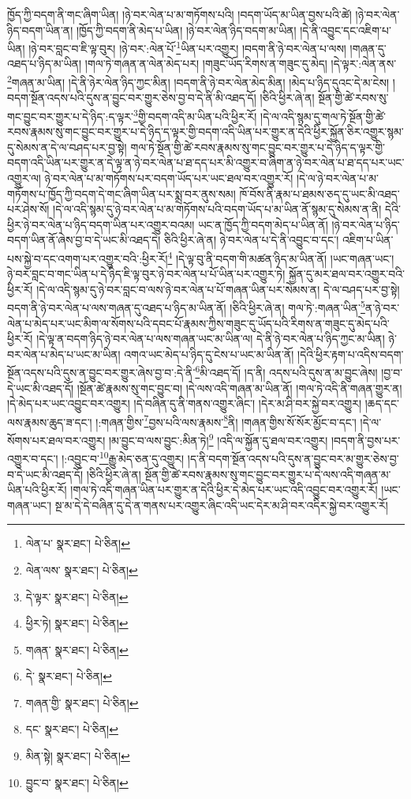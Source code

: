 ཁྱོད་ཀྱི་བདག་ནི་གང་ཞིག་ཡིན། །ཉེ་བར་ལེན་པ་མ་གཏོགས་པའི། །བདག་ཡོད་མ་ཡིན་བྱས་པའི་ཚེ། །ཉེ་བར་ལེན་ཉིད་བདག་ཡིན་ན། །ཁྱོད་ཀྱི་བདག་ནི་མེད་པ་ཡིན། །ཉེ་བར་ལེན་ཉིད་བདག་མ་ཡིན། །དེ་ནི་འབྱུང་དང་འཇིག་པ་ཡིན། །ཉེ་བར་བླང་བ་ཇི་ལྟ་བུར། །ཉེ་བར་:ལེན་པོ་\footnote{ལེན་པ་  སྣར་ཐང་།  པེ་ཅིན། }ཡིན་པར་འགྱུར། །བདག་ནི་ཉེ་བར་ལེན་པ་ལས། །གཞན་དུ་འཐད་པ་ཉིད་མ་ཡིན། །གལ་ཏེ་གཞན་ན་ལེན་མེད་པར། །གཟུང་ཡོད་རིགས་ན་གཟུང་དུ་མེད། །དེ་ལྟར་:ལེན་ནས་\footnote{ལེན་ལས་  སྣར་ཐང་།  པེ་ཅིན། }གཞན་མ་ཡིན། །དེ་ནི་ཉེར་ལེན་ཉིད་ཀྱང་མིན། །བདག་ནི་ཉེ་བར་ལེན་མེད་མིན། །མེད་པ་ཉིད་དུའང་དེ་མ་ངེས། །བདག་སྔོན་འདས་པའི་དུས་ན་བྱུང་བར་གྱུར་ཅེས་བྱ་བ་དེ་ནི་མི་འཐད་དོ། །ཅིའི་ཕྱིར་ཞེ་ན། སྔོན་གྱི་ཚེ་རབས་སུ་གང་བྱུང་བར་གྱུར་པ་དེ་ཉིད་:ད་ལྟར་\footnote{དེ་ལྟར་  སྣར་ཐང་།  པེ་ཅིན། }གྱི་བདག་འདི་མ་ཡིན་པའི་ཕྱིར་རོ། །དེ་ལ་འདི་སྙམ་དུ་གལ་ཏེ་སྔོན་གྱི་ཚེ་རབས་རྣམས་སུ་གང་བྱུང་བར་གྱུར་པ་དེ་ཉིད་ད་ལྟར་གྱི་བདག་འདི་ཡིན་པར་གྱུར་ན་དེའི་ཕྱིར་སྐྱོན་ཅིར་འགྱུར་སྙམ་དུ་སེམས་ན་དེ་ལ་བཤད་པར་བྱ་སྟེ། གལ་ཏེ་སྔོན་གྱི་ཚེ་རབས་རྣམས་སུ་གང་བྱུང་བར་གྱུར་པ་དེ་ཉིད་ད་ལྟར་གྱི་བདག་འདི་ཡིན་པར་གྱུར་ན་དེ་ལྟ་ན་ཉེ་བར་ལེན་པ་ཐ་དད་པར་མི་འགྱུར་བ་ཞིག་ན་ཉེ་བར་ལེན་པ་ཐ་དད་པར་ཡང་འགྱུར་ལ། ཉེ་བར་ལེན་པ་མ་གཏོགས་པར་བདག་ཡོད་པར་ཡང་ཐལ་བར་འགྱུར་རོ། །དེ་ལ་ཉེ་བར་ལེན་པ་མ་གཏོགས་པ་ཁྱོད་ཀྱི་བདག་དེ་གང་ཞིག་ཡིན་པར་སྨྲ་བར་ནུས་སམ། ཁོ་བོས་ནི་རྣམ་པ་ཐམས་ཅད་དུ་ཡང་མི་འཐད་པར་ཤེས་སོ། །དེ་ལ་འདི་སྙམ་དུ་ཉེ་བར་ལེན་པ་མ་གཏོགས་པའི་བདག་ཡོད་པ་མ་ཡིན་ནོ་སྙམ་དུ་སེམས་ན་ནི། དེའི་ཕྱིར་ཉེ་བར་ལེན་པ་ཉིད་བདག་ཡིན་པར་འགྱུར་བའམ། ཡང་ན་ཁྱོད་ཀྱི་བདག་མེད་པ་ཡིན་ནོ། །ཉེ་བར་ལེན་པ་ཉིད་བདག་ཡིན་ནོ་ཞེས་བྱ་བ་དེ་ཡང་མི་འཐད་དེ། ཅིའི་ཕྱིར་ཞེ་ན། ཉེ་བར་ལེན་པ་དེ་ནི་འབྱུང་བ་དང་། འཇིག་པ་ཡིན་པས་སྐྱེ་བ་དང་འགག་པར་འགྱུར་བའི་:ཕྱིར་རོ།\footnote{ཕྱིར་ཏེ།  སྣར་ཐང་།  པེ་ཅིན། } །དེ་ལྟ་བུ་ནི་བདག་གི་མཚན་ཉིད་མ་ཡིན་ནོ། །ཡང་གཞན་ཡང་། ཉེ་བར་བླང་བ་གང་ཡིན་པ་དེ་ཉིད་ཇི་ལྟ་བུར་ཉེ་བར་ལེན་པ་པོ་ཡིན་པར་འགྱུར་ཏེ། སྐྱོན་དུ་མར་ཐལ་བར་འགྱུར་བའི་ཕྱིར་རོ། །དེ་ལ་འདི་སྙམ་དུ་ཉེ་བར་བླང་བ་ལས་ཉེ་བར་ལེན་པ་པོ་གཞན་ཡིན་པར་སེམས་ན། དེ་ལ་བཤད་པར་བྱ་སྟེ། བདག་ནི་ཉེ་བར་ལེན་པ་ལས་གཞན་དུ་འཐད་པ་ཉིད་མ་ཡིན་ནོ། །ཅིའི་ཕྱིར་ཞེ་ན། གལ་ཏེ་:གཞན་ཡིན་\footnote{གཞན་  སྣར་ཐང་།  པེ་ཅིན། }ན་ཉེ་བར་ལེན་པ་མེད་པར་ཡང་མིག་ལ་སོགས་པའི་དབང་པོ་རྣམས་ཀྱིས་གཟུང་དུ་ཡོད་པའི་རིགས་ན་གཟུང་དུ་མེད་པའི་ཕྱིར་རོ། །དེ་ལྟ་ན་བདག་ཉིད་ཉེ་བར་ལེན་པ་ལས་གཞན་ཡང་མ་ཡིན་ལ། དེ་ནི་ཉེ་བར་ལེན་པ་ཉིད་ཀྱང་མ་ཡིན། ཉེ་བར་ལེན་པ་མེད་པ་ཡང་མ་ཡིན། འགའ་ཡང་མེད་པ་ཉིད་དུ་ངེས་པ་ཡང་མ་ཡིན་ནོ། །དེའི་ཕྱིར་རྟག་པ་འདིས་བདག་སྔོན་འདས་པའི་དུས་ན་བྱུང་བར་གྱུར་ཞེས་བྱ་བ་:དེ་ནི་\footnote{དེ་  སྣར་ཐང་།  པེ་ཅིན། }མི་འཐད་དོ། །ད་ནི། འདས་པའི་དུས་ན་མ་བྱུང་ཞེས། །བྱ་བ་དེ་ཡང་མི་འཐད་དོ། །སྔོན་ཚེ་རྣམས་སུ་གང་བྱུང་བ། །དེ་ལས་འདི་གཞན་མ་ཡིན་ནོ། །གལ་ཏེ་འདི་ནི་གཞན་གྱུར་ན། །དེ་མེད་པར་ཡང་འབྱུང་བར་འགྱུར། །དེ་བཞིན་དུ་ནི་གནས་འགྱུར་ཞིང་། །དེར་མ་ཤི་བར་སྐྱེ་བར་འགྱུར། །ཆད་དང་ལས་རྣམས་ཆུད་ཟ་དང་། །:གཞན་གྱིས་\footnote{གཞན་གྱི་  སྣར་ཐང་།  པེ་ཅིན། }བྱས་པའི་ལས་རྣམས་\footnote{དང་  སྣར་ཐང་།  པེ་ཅིན། }ནི། །གཞན་གྱིས་སོ་སོར་མྱོང་བ་དང་། །དེ་ལ་སོགས་པར་ཐལ་བར་འགྱུར། །མ་བྱུང་བ་ལས་བྱུང་:མིན་ཏེ།\footnote{མིན་སྟེ།  སྣར་ཐང་།  པེ་ཅིན། } །འདི་ལ་སྐྱོན་དུ་ཐལ་བར་འགྱུར། །བདག་ནི་བྱས་པར་འགྱུར་བ་དང་། །:འབྱུང་བ་\footnote{བྱུང་བ་  སྣར་ཐང་།  པེ་ཅིན། }རྒྱུ་མེད་ཅན་དུ་འགྱུར། །ད་ནི་བདག་སྔོན་འདས་པའི་དུས་ན་བྱུང་བར་མ་གྱུར་ཅེས་བྱ་བ་དེ་ཡང་མི་འཐད་དོ། །ཅིའི་ཕྱིར་ཞེ་ན། སྔོན་གྱི་ཚེ་རབས་རྣམས་སུ་གང་བྱུང་བར་གྱུར་པ་དེ་ལས་འདི་གཞན་མ་ཡིན་པའི་ཕྱིར་རོ། །གལ་ཏེ་འདི་གཞན་ཡིན་པར་གྱུར་ན་དེའི་ཕྱིར་དེ་མེད་པར་ཡང་འདི་འབྱུང་བར་འགྱུར་རོ། །ཡང་གཞན་ཡང་། སྔ་མ་དེ་དེ་བཞིན་དུ་དེ་ན་གནས་པར་འགྱུར་ཞིང་འདི་ཡང་དེར་མ་ཤི་བར་འདིར་སྐྱེ་བར་འགྱུར་རོ། 